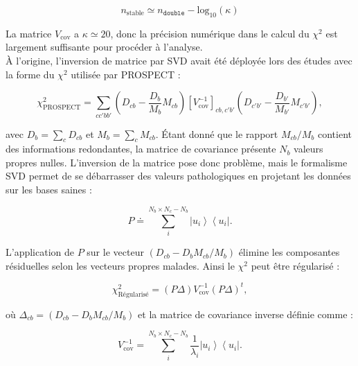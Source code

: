 \begin{equation}
    n_\textrm{stable} \simeq n_\texttt{double} - \textrm{log}_{10}\left(\kappa\right)
\end{equation}

\bigbreak

La matrice $V_\textrm{cov}$ a $\kappa \simeq 20$, donc la précision numérique dans le calcul du $\chi^2$ est largement suffisante pour procéder à l'analyse.\\

À l'origine, l'inversion de matrice par SVD avait été déployée lors des études avec la forme du $\chi^2$ utilisée par PROSPECT \cite{Ashenfelter:2018iov}:

\begin{equation}
    \chi^2_\textrm{PROSPECT} = \sum_{cc'bb'} \left(D_{cb} - \frac{D_b}{M_b} M_{cb} \right) \left[V_\textrm{cov}^{-1}\right]_{cb,c'b'} \left(D_{c'b'} - \frac{D_{b'}}{M_{b'}} M_{c'b'} \right),
\end{equation}

\bigbreak

avec $D_b = \sum_c D_{cb}$ et $M_b = \sum_c M_{cb}$. Étant donné que le rapport $M_{cb}/M_{b}$ contient des informations redondantes, la matrice de covariance présente $N_b$ valeurs propres nulles. L'inversion de la matrice pose donc problème, mais le formalisme SVD permet de se débarrasser des valeurs pathologiques en projetant les données sur les bases saines :

\begin{equation}
    P \doteq \sum_i^{N_b \times N_c - N_b} \left| u_i \right> \left< u_i \right|.
\end{equation}

\bigbreak

L'application de $P$ sur le vecteur $(D_{cb} - D_b M_{cb}/M_b)$ élimine les composantes résiduelles selon les vecteurs propres malades. Ainsi le $\chi^2$ peut être régularisé :

\begin{equation}
    \chi^2_\textrm{Régularisé} = \left(P\Delta \right) V_\textrm{cov}^{-1} \left(P\Delta \right)^t,
\end{equation}

\bigbreak

où $\Delta_{cb} = (D_{cb} - D_b M_{cb}/M_b)$ et la matrice de covariance inverse définie comme :

\begin{equation}
    V_\textrm{cov}^{-1} = \sum_i^{N_b \times N_c - N_b} \frac{1}{\lambda_i} \left| u_i \right> \left< u_i \right|.
\end{equation}

